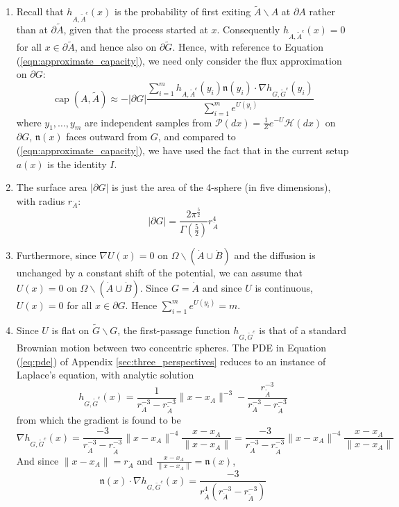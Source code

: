 \documentclass[12pt, nofootinbib,english, amsmath, amssymb, aps, priprint, graphicx,floatfix]{revtex4-1}
\theoremstyle{plain}
\theoremstyle{definition}
\theoremstyle{plain}
\newcommand{\normal}{{\mathfrak{n}}}
\newcommand{\capac}[2]{\ensuremath{\operatorname{cap}}(#1,#2)}
\newcommand{\hausdorffmeasure}{\mathscr{H}(dx)}
\newcommand{\PMeasure}{\mathscr{P}(dx)}
\newcommand{\dA}{{\dot A}}
\newcommand{\tA}{{\tilde A}}
\newcommand{\dB}{{\dot B}}
\begin{document}
\begin{enumerate}

\item Recall that $h_{A,\tA^c}(x)$ is the probability of first exiting $\tilde{A}\backslash A$ at $\partial A$ rather than at $\partial\tA$, given that the process started at $x$. 
Consequently $h_{A,\tA^c}(x)=0$ for all $x\in\partial\tA$, and hence also on $\partial\tilde{G}$.
Hence, with reference to Equation (\ref{eqn:approximate_capacity}), we need only consider the flux approximation on $\partial G$:
\begin{equation}
\label{eqn:toy_cap_approx}
\capac{A}{\tilde A} \approx
-|\partial G|
\frac{\sum_{i=1}^m 
h_{A, \tilde{A}^c}(y_i) \normal(y_i)\cdot \nabla h_{G,\tilde{G}^c}(y_i)}
{\sum_{i=1}^m e^{U(y_i)}}
\end{equation}
where $y_1,\ldots,y_m$ are independent samples from 
$\PMeasure=\frac{1}{Z}e^{-U}\hausdorffmeasure$ on $\partial G$, $\normal(x)$ faces outward from $G$, and compared to (\ref{eqn:approximate_capacity}), we have used the fact that in the current setup $a(x)$ is the identity $I$.
 
 \item The surface area $|\partial G|$ is just the area of the 4-sphere (in five dimensions), with radius $r_\dA$:
 \[
 |\partial G| = \frac{2\pi^{\frac{5}{2}}}{\Gamma(\frac{5}{2})}r_\dA^4
 \]
 
 \item 
Furthermore, since 
$\nabla U(x)=0$ on $\Omega\backslash(\dA\cup\dB)$ and the diffusion is unchanged by a constant shift of the potential, we can assume that $U(x)=0$ on $\Omega\backslash(\dA\cup\dB)$. 
Since $G=\dA$ and since $U$ is continuous, $U(x)=0$ for all $x\in \partial G$. Hence $\sum_{i=1}^m e^{U(y_i)}=m$.
 
\item 
\label{lab:analytic}
Since $U$ is flat on $\tilde G \backslash G$, the first-passage function $h_{G,\tilde G^c}$ is that of a standard Brownian motion between two concentric spheres. The PDE in Equation (\ref{eq:pde}) of Appendix \ref{sec:three_perspectives} reduces to an instance of Laplace's equation, with analytic solution\cite{Wendel1980-sj}
 \[ h_{G, \tilde{G}^c} (x) = \frac{1}{r_\dA^{-3} - r_{\tilde{A}}^{ -3}} \| x
- x_A \|^{-3} - \frac{r_{\tilde{A}}^{-3}}{r_\dA^{-3} -
r_{\tilde{A}}^{-3}} \]
from which the gradient is found to be 
\[
\nabla h_{G, \tilde{G}^c} (x)  = \frac{-3}{r_\dA^{-3} - r_{\tilde{A}}^{-3}} \| x - x_A \|^{-4} \frac{x - x_A}{\| x - x_A \|} 
= \frac{-3}{r_\dA^{-3} - r_{\tilde{A}}^{-3}} \| x - x_A \|^{-4} \frac{x - x_A}{\| x - x_A \|} 
\]
And since $\| x - x_A \|=r_\dA$ and  $\frac{x - x_A}{\| x - x_A \|} 
=\normal(x)$,
\[
\normal(x)\cdot\nabla h_{G, \tilde{G}^c} (x)  = 
\frac{-3}
{r_\dA^4(r_\dA^{-3} - r_\tA^{-3})} 
\]


\end{enumerate}
\end{document}

